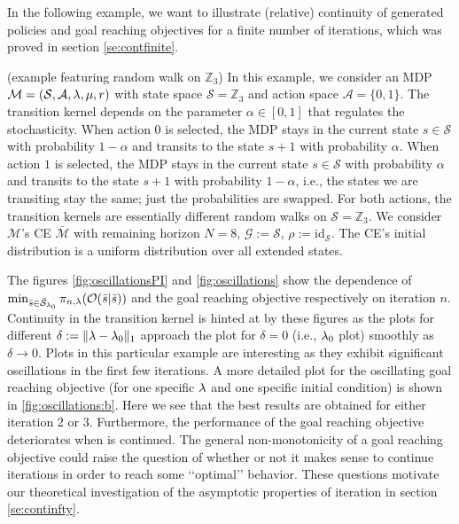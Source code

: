In the following example, we want to illustrate (relative) continuity of \eUDRL{} generated policies and goal reaching objectives for a finite number of iterations, which was proved in section \ref{se:contfinite}. 
\begin{example}
\label{ex:oscillations} (example featuring random walk on $\mathbb{Z}_3$)
In this example, we consider an MDP $\mathcal{M} = (\mathcal{S},\mathcal{A},\mathit{\lambda},\mu,r)$ with state space $\mathcal{S} = \mathbb{Z}_3$ and action space $\mathcal{A}=\{0,1\}$.
The transition kernel depends on the parameter $\alpha \in [0,1]$ that regulates the
stochasticity.
When action $0$ is selected, the MDP stays in the current state $s\in\mathcal{S}$ with probability $1-\alpha$ and transits to the state $s+1$ with probability $\alpha$.
When action $1$ is selected, the MDP stays in the current state $s \in \mathcal{S}$ with probability $\alpha$ and transits to the state $s+1$ with probability $1-\alpha$, i.e., the states we are transiting stay the same; just the probabilities are swapped. For both actions, the transition kernels are essentially
different random walks on $\mathcal{S} = \mathbb{Z}_3$.
We consider $\mathcal{M}$'s CE $\bar{\mathcal{M}}$ with remaining horizon $N=8$,
$\mathcal{G}:=\mathcal{S}$, $\rho :=\mathrm{id}_{\mathcal{S}}$.
The CE's initial distribution is a uniform distribution over all extended states.
\end{example}
The figures \ref{fig:oscillationsPI} and \ref{fig:oscillations} show the dependence
of $\min_{\bar{s}\in\bar{\mathcal{S}}_{\mathit{\lambda}_0}} \pi_{n,\mathit{\lambda}}(\mathcal{O}(\bar{s}|\bar{s}))$ and the goal reaching objective respectively on iteration $n$.
Continuity in the transition kernel is hinted
at by these figures as the plots for different $\delta := \|\mathit{\lambda}-\mathit{\lambda}_0\|_1$
approach the plot for $\delta = 0 $ (i.e., $\mathit{\lambda}_0$ plot) smoothly as
$\delta \rightarrow 0$. Plots in this particular example are interesting
as they exhibit significant oscillations in the first few iterations.
A more detailed plot for the oscillating goal reaching objective (for one specific $\mathit{\lambda}$ and one specific initial condition) is shown in \ref{fig:oscillations:b}. Here we see that the best results are obtained
for either iteration 2 or 3. Furthermore, the performance of the goal reaching objective deteriorates
when \eUDRL{} is continued.
The general non-monotonicity of a goal reaching objective could raise the question of
whether or not it makes sense to continue \eUDRL{} iterations in order to reach some
\lq\lq{}optimal\rq\rq{} behavior. These questions motivate our theoretical investigation
of the asymptotic properties of \eUDRL{} iteration in section \ref{se:continfty}.

